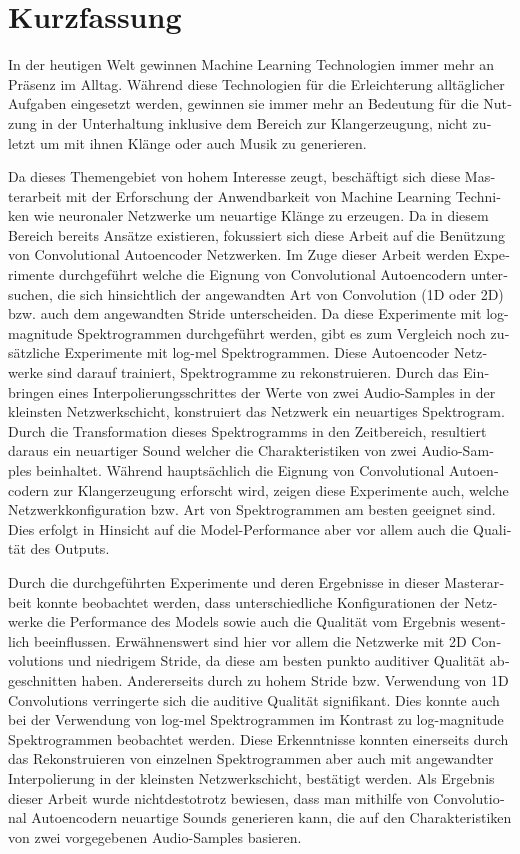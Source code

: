 \chapter{Kurzfassung}

\begin{german}
In der heutigen Welt gewinnen Machine Learning Technologien immer mehr an Präsenz im Alltag. Während diese Technologien für die Erleichterung alltäglicher Aufgaben eingesetzt werden, gewinnen sie immer mehr an Bedeutung für die Nutzung in der Unterhaltung inklusive dem Bereich zur Klangerzeugung, nicht zuletzt um mit ihnen Klänge oder auch Musik zu generieren. 

Da dieses Themengebiet von hohem Interesse zeugt, beschäftigt sich diese Masterarbeit mit der Erforschung der Anwendbarkeit von Machine Learning Techniken wie neuronaler Netzwerke um neuartige Klänge zu erzeugen. Da in diesem Bereich bereits Ansätze existieren, fokussiert sich diese Arbeit auf die Benützung von Convolutional Autoencoder Netzwerken. Im Zuge dieser Arbeit werden Experimente durchgeführt welche die Eignung von Convolutional Autoencodern untersuchen, die sich hinsichtlich der angewandten Art von Convolution (1D oder 2D) bzw. auch dem angewandten Stride unterscheiden. Da diese Experimente mit log-magnitude Spektrogrammen durchgeführt werden, gibt es zum Vergleich noch zusätzliche Experimente mit log-mel Spektrogrammen. Diese Autoencoder Netzwerke sind darauf trainiert, Spektrogramme zu rekonstruieren. Durch das Einbringen eines Interpolierungsschrittes der Werte von zwei Audio-Samples in der kleinsten Netzwerkschicht, konstruiert das Netzwerk ein neuartiges Spektrogram. Durch die Transformation dieses Spektrogramms in den Zeitbereich, resultiert daraus ein neuartiger Sound welcher die Charakteristiken von zwei Audio-Samples beinhaltet. Während hauptsächlich die Eignung von Convolutional Autoencodern zur Klangerzeugung erforscht wird, zeigen diese Experimente auch, welche Netzwerkkonfiguration bzw. Art von Spektrogrammen am besten geeignet sind. Dies erfolgt in Hinsicht auf die Model-Performance aber vor allem auch die Qualität des Outputs.

Durch die durchgeführten Experimente und deren Ergebnisse in dieser Masterarbeit konnte beobachtet werden, dass unterschiedliche Konfigurationen der Netzwerke die Performance des Models sowie auch die Qualität vom Ergebnis wesentlich beeinflussen. Erwähnenswert sind hier vor allem die Netzwerke mit 2D Convolutions und niedrigem Stride, da diese am besten punkto auditiver Qualität abgeschnitten haben. Andererseits durch zu hohem Stride bzw. Verwendung von 1D Convolutions verringerte sich die auditive Qualität signifikant. Dies konnte auch bei der Verwendung von log-mel Spektrogrammen im Kontrast zu log-magnitude Spektrogrammen beobachtet werden. Diese Erkenntnisse konnten einerseits durch das Rekonstruieren von einzelnen Spektrogrammen aber auch mit angewandter Interpolierung in der kleinsten Netzwerkschicht, bestätigt werden. Als Ergebnis dieser Arbeit wurde nichtdestotrotz bewiesen, dass man mithilfe von Convolutional Autoencodern neuartige Sounds generieren kann, die auf den Charakteristiken von zwei vorgegebenen Audio-Samples basieren.

\end{german}